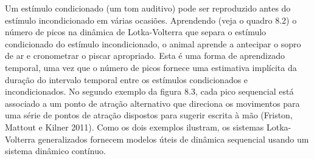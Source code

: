 \documentclass[
  12pt,
]{book}
\begin{document}
Um estímulo condicionado (um tom auditivo) pode ser reproduzido antes do estímulo incondicionado em várias ocasiões. Aprendendo (veja o quadro 8.2) o número de picos na dinâmica de Lotka-Volterra que separa o estímulo condicionado do estímulo incondicionado, o animal aprende a antecipar o sopro de ar e cronometrar o piscar apropriado. Esta é uma forma de aprendizado temporal, uma vez que o número de picos fornece uma estimativa implícita da duração do intervalo temporal entre os estímulos condicionados e incondicionados. No segundo exemplo da figura 8.3, cada pico sequencial está associado a um ponto de atração alternativo que direciona os movimentos para uma série de pontos de atração dispostos para sugerir escrita à mão (Friston, Mattout e Kilner 2011). Como os dois exemplos ilustram, os sistemas Lotka-Volterra generalizados fornecem modelos úteis de dinâmica sequencial usando um sistema dinâmico contínuo.
\end{document}
